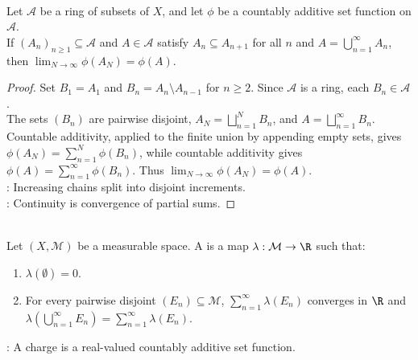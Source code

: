 \begin{theorem} \label{thm:continuity-from-below-set-functions} \\
Let $\mathcal{A}$ be a ring of subsets of $X$, and let $\phi$ be a countably additive set function on $\mathcal{A}$.\\
If $(A_n)_{n\geq1}\subseteq\mathcal{A}$ and $A\in\mathcal{A}$ satisfy $A_n\subseteq A_{n+1}$ for all $n$ and $A=\bigcup_{n=1}^{\infty}A_n$, then $\lim_{N\to\infty}\phi(A_N)=\phi(A)$.
\begin{proof} Set $B_1=A_1$ and $B_n=A_n\setminus A_{n-1}$ for $n\geq2$. Since $\mathcal{A}$ is a ring, each $B_n\in\mathcal{A}$.\\
The sets $(B_n)$ are pairwise disjoint, $A_N=\bigsqcup_{n=1}^{N}B_n$, and $A=\bigsqcup_{n=1}^{\infty}B_n$.\\
Countable additivity, applied to the finite union by appending empty sets, gives $\phi(A_N)=\sum_{n=1}^{N}\phi(B_n)$, while countable additivity gives $\phi(A)=\sum_{n=1}^{\infty}\phi(B_n)$. Thus $\lim_{N\to\infty}\phi(A_N)=\phi(A)$.\\
: Increasing chains split into disjoint increments.\\
: Continuity is convergence of partial sums.
\end{proof}
\end{theorem}

\begin{definition} \label{def:charges-finite-signed-measures} \\
Let $(X,\mathcal{M})$ be a measurable space. A  is a map $\lambda:\mathcal{M}\to\R$ such that:
\begin{enumerate}[label=(\roman*)]
\setlength{\itemsep}{0pt}
\item $\lambda(\emptyset)=0$.
\item For every pairwise disjoint $(E_n)\subseteq\mathcal{M}$, $\sum\limits_{n=1}^{\infty}\lambda(E_n)$ converges in $\R$ and $\lambda\left(\bigcup\limits_{n=1}^{\infty}E_n\right)=\sum\limits_{n=1}^{\infty}\lambda(E_n)$.
\end{enumerate}
: A charge is a real-valued countably additive set function.
\end{definition}

